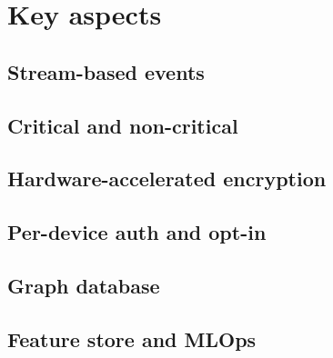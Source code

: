 \section{Key aspects}
\label{chapter4-key-aspects}

\subsection{Stream-based events}
\label{chapter4-stream-based-events}

\subsection{Critical and non-critical}
\label{chapter4-critical-and-non-critical}

\subsection{Hardware-accelerated encryption}
\label{chapter4-hardware-accelerated-encryption}

\subsection{Per-device auth and opt-in}
\label{chapter4-user-side-opt-in}

\subsection{Graph database}
\label{chapter4-graph-database}

\subsection{Feature store and MLOps}
\label{chapter4-feature-store-and-mlops}

